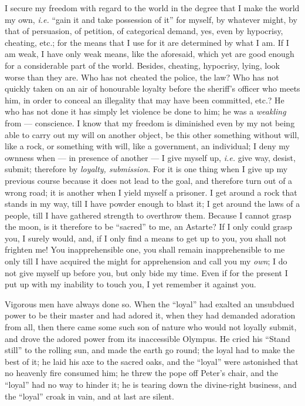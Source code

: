I secure my freedom with regard to the world in the degree that I make the 
world my own, \textit{i.e.} ``gain it and take possession of it'' for 
myself, by whatever might, by that of persuasion, of petition, of categorical 
demand, yes, even by hypocrisy, cheating, etc.; for the means that I use for 
it are determined by what I am. If I am weak, I have only weak means, like the 
aforesaid, which yet are good enough for a considerable part of the world. 
Besides, cheating, hypocrisy, lying, look worse than they are. Who has not 
cheated the police, the law? Who has not quickly taken on an air of honourable 
loyalty before the sheriff's officer who meets him, in order to conceal an 
illegality that may have been committed, etc.? He who has not done it has 
simply let violence be done to him; he was a \textit{weakling} from --- 
conscience. I know that my freedom is diminished even by my not being able to 
carry out my will on another object, be this other something without will, 
like a rock, or something with will, like a government, an individual; I deny 
my ownness when --- in presence of another --- I give myself up, \textit{i.e.} 
give way, desist, submit; therefore by \textit{loyalty, submission}. For it is 
one thing when I give up my previous course because it does not lead to the 
goal, and therefore turn out of a wrong road; it is another when I yield 
myself a prisoner. I get around a rock that stands in my way, till I have 
powder enough to blast it; I get around the laws of a people, till I have 
gathered strength to overthrow them. Because I cannot grasp the moon, is it 
therefore to be ``sacred'' to me, an Astarte? If I only could grasp you, I 
surely would, and, if I only find a means to get up to you, you shall not 
frighten me! You inapprehensible one, you shall remain inapprehensible to me 
only till I have acquired the might for apprehension and call you my 
\textit{own}; I do not give myself up before you, but only bide my time. Even 
if for the present I put up with my inability to touch you, I yet remember it 
against you.

Vigorous men have always done so. When the ``loyal'' had exalted an 
unsubdued power to be their master and had adored it, when they had demanded 
adoration from all, then there came some such son of nature who would not 
loyally submit, and drove the adored power from its inaccessible Olympus. He 
cried his ``Stand still'' to the rolling sun, and made the earth go round; 
the loyal had to make the best of it; he laid his axe to the sacred oaks, and 
the ``loyal'' were astonished that no heavenly fire consumed him; he threw 
the pope off Peter's chair, and the ``loyal'' had no way to hinder it; he is 
tearing down the divine-right business, and the ``loyal'' croak in vain, and 
at last are silent.

